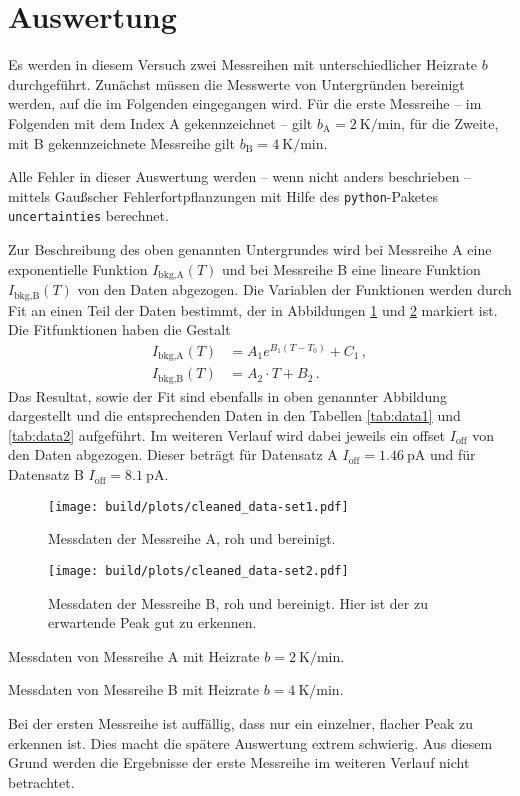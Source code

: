 \section{Auswertung}
\label{sec:auswertung}
Es werden in diesem Versuch zwei Messreihen mit unterschiedlicher Heizrate
$b$ durchgeführt. Zunächst müssen die Messwerte von Untergründen bereinigt
werden, auf die im Folgenden eingegangen wird.
Für die erste Messreihe -- im Folgenden mit dem Index A gekennzeichnet --
gilt $b_\text{A} = \SI{2}{\kelvin\per\minute}$, für die Zweite, mit B
gekennzeichnete Messreihe gilt $b_\text{B} = \SI{4}{\kelvin\per\minute}$.

Alle Fehler in dieser Auswertung werden -- wenn nicht anders beschrieben --
mittels Gaußscher Fehlerfortpflanzungen mit Hilfe des \texttt{python}-Paketes
\texttt{uncertainties} \cite{py-uncertainties} berechnet.

Zur Beschreibung des oben genannten Untergrundes wird bei Messreihe A eine
exponentielle Funktion $I_\text{bkg,A}(T)$ und bei Messreihe B eine lineare
Funktion
$I_\text{bkg,B}(T)$ von den Daten abgezogen. Die Variablen der Funktionen werden
durch Fit an einen Teil der Daten bestimmt, der in Abbildungen
\ref{fig:data-a} und \ref{fig:data-b} markiert ist.
Die Fitfunktionen haben die Gestalt
\begin{align*}
    I_\text{bkg,A}(T) &= A_1 e^{B_1 (T-T_0)} + C_1\,,\\
    I_\text{bkg,B}(T) &= A_2\cdot T + B_2\,.
\end{align*}
Das Resultat, sowie der Fit sind ebenfalls in oben genannter Abbildung
dargestellt und die entsprechenden Daten in den Tabellen \ref{tab:data1} und
\ref{tab:data2} aufgeführt.
Im weiteren Verlauf wird dabei jeweils ein offset $I_\text{off}$ von den Daten
abgezogen. Dieser beträgt für Datensatz A $I_\text{off} = \SI{1.46}{\pico\ampere}$
und für Datensatz B $I_\text{off} = \SI{8.1}{\pico\ampere}$.
\begin{figure}
    \centering
    \texttt{[image: build/plots/cleaned\_data-set1.pdf]}
    \caption{Messdaten der Messreihe A, roh und bereinigt.}
    \label{fig:data-a}
\end{figure}
\begin{figure}
    \centering
    \texttt{[image: build/plots/cleaned\_data-set2.pdf]}
    \caption{Messdaten der Messreihe B, roh und bereinigt. Hier ist
    der zu erwartende Peak gut zu erkennen.}
    \label{fig:data-b}
\end{figure}
\begin{table}
    \centering
    \caption{Messdaten von Messreihe A mit Heizrate $b = \SI{2}{\kelvin\per\minute}$.}
    \label{tab:data1}
    
\end{table}
\begin{table}
    \centering
    \caption{Messdaten von Messreihe B mit Heizrate $b = \SI{4}{\kelvin\per\minute}$.}
    \label{tab:data2}
    
\end{table}
Bei der ersten Messreihe ist auffällig, dass nur ein einzelner, flacher Peak
zu erkennen ist. Dies macht die spätere Auswertung extrem schwierig.
Aus diesem Grund werden die Ergebnisse der erste Messreihe im weiteren
Verlauf nicht betrachtet.

